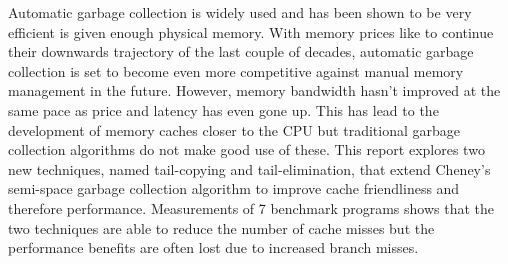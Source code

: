 Automatic garbage collection is widely used and has been shown to be very
efficient is given enough physical memory. With memory prices like to continue
their downwards trajectory of the last couple of decades, automatic garbage
collection is set to become even more competitive against manual memory management
in the future. However, memory bandwidth hasn't improved at the same pace as price
and latency has even gone up. This has lead to the development of memory caches
closer to the CPU but traditional garbage collection algorithms do not make good
use of these. This report explores two new techniques, named tail-copying and
tail-elimination, that extend Cheney's
semi-space garbage collection algorithm to improve cache friendliness and therefore
performance. Measurements of 7 benchmark programs shows that the two techniques
are able to reduce the number of cache misses but the performance benefits are
often lost due to increased branch misses.
